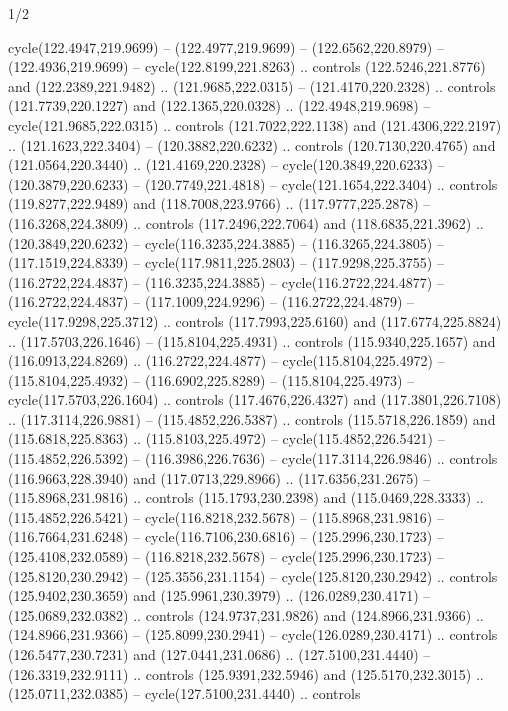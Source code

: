 \begin{flagdescription}{1/2}
\begin{scope}[shift={(0.26984,0.5)},scale=1/2.54]
\begin{scope}[scale=\flagwidth/550]
\begin{scope}
  cycle(122.4947,219.9699) -- (122.4977,219.9699) -- (122.6562,220.8979) --
  (122.4936,219.9699) -- cycle(122.8199,221.8263) .. controls
  (122.5246,221.8776) and (122.2389,221.9482) .. (121.9685,222.0315) --
  (121.4170,220.2328) .. controls (121.7739,220.1227) and (122.1365,220.0328) ..
  (122.4948,219.9698) -- cycle(121.9685,222.0315) .. controls
  (121.7022,222.1138) and (121.4306,222.2197) .. (121.1623,222.3404) --
  (120.3882,220.6232) .. controls (120.7130,220.4765) and (121.0564,220.3440) ..
  (121.4169,220.2328) -- cycle(120.3849,220.6233) -- (120.3879,220.6233) --
  (120.7749,221.4818) -- cycle(121.1654,222.3404) .. controls
  (119.8277,222.9489) and (118.7008,223.9766) .. (117.9777,225.2878) --
  (116.3268,224.3809) .. controls (117.2496,222.7064) and (118.6835,221.3962) ..
  (120.3849,220.6232) -- cycle(116.3235,224.3885) -- (116.3265,224.3805) --
  (117.1519,224.8339) -- cycle(117.9811,225.2803) -- (117.9298,225.3755) --
  (116.2722,224.4837) -- (116.3235,224.3885) -- cycle(116.2722,224.4877) --
  (116.2722,224.4837) -- (117.1009,224.9296) -- (116.2722,224.4879) --
  cycle(117.9298,225.3712) .. controls (117.7993,225.6160) and
  (117.6774,225.8824) .. (117.5703,226.1646) -- (115.8104,225.4931) .. controls
  (115.9340,225.1657) and (116.0913,224.8269) .. (116.2722,224.4877) --
  cycle(115.8104,225.4972) -- (115.8104,225.4932) -- (116.6902,225.8289) --
  (115.8104,225.4973) -- cycle(117.5703,226.1604) .. controls
  (117.4676,226.4327) and (117.3801,226.7108) .. (117.3114,226.9881) --
  (115.4852,226.5387) .. controls (115.5718,226.1859) and (115.6818,225.8363) ..
  (115.8103,225.4972) -- cycle(115.4852,226.5421) -- (115.4852,226.5392) --
  (116.3986,226.7636) -- cycle(117.3114,226.9846) .. controls
  (116.9663,228.3940) and (117.0713,229.8966) .. (117.6356,231.2675) --
  (115.8968,231.9816) .. controls (115.1793,230.2398) and (115.0469,228.3333) ..
  (115.4852,226.5421) -- cycle(116.8218,232.5678) -- (115.8968,231.9816) --
  (116.7664,231.6248) -- cycle(116.7106,230.6816) -- (125.2996,230.1723) --
  (125.4108,232.0589) -- (116.8218,232.5678) -- cycle(125.2996,230.1723) --
  (125.8120,230.2942) -- (125.3556,231.1154) -- cycle(125.8120,230.2942) ..
  controls (125.9402,230.3659) and (125.9961,230.3979) .. (126.0289,230.4171) --
  (125.0689,232.0382) .. controls (124.9737,231.9826) and (124.8966,231.9366) ..
  (124.8966,231.9366) -- (125.8099,230.2941) -- cycle(126.0289,230.4171) ..
  controls (126.5477,230.7231) and (127.0441,231.0686) .. (127.5100,231.4440) --
  (126.3319,232.9111) .. controls (125.9391,232.5946) and (125.5170,232.3015) ..
  (125.0711,232.0385) -- cycle(127.5100,231.4440) .. controls

\end{scope}
\end{scope}
\end{scope}
\end{flagdescription}
